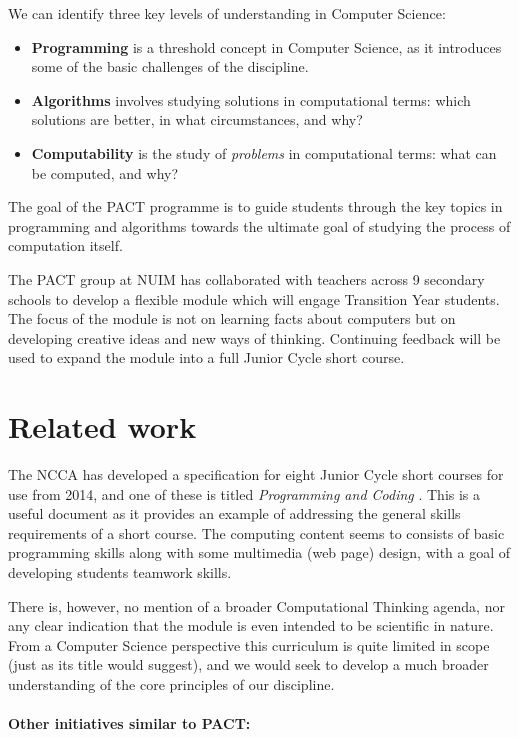 \documentclass[a4paper]{article}
\begin{document}
We can identify three key levels of understanding in Computer Science:
\begin{itemize}
\item \textbf{Programming} is a threshold concept in Computer Science, as it introduces some of the basic challenges of the discipline.  
\item \textbf{Algorithms} involves studying solutions in computational terms: which solutions are better, in what circumstances, and why?
\item \textbf{Computability} is the study of \textit{problems} in 
computational terms: what can be computed, and why?
\end{itemize}

The goal of the PACT programme is to guide students through the key topics in programming and algorithms towards the ultimate goal of studying the process of computation itself.

The PACT group at NUIM has collaborated with teachers across 9 secondary schools to develop a flexible module which will engage Transition Year students.  The focus of the module is not on learning facts about computers but on developing creative ideas and new ways of thinking.  Continuing feedback will be used to expand the module into a full Junior Cycle short course. 

\section{Related work} \label{sect:relWork}

The NCCA has developed a specification for eight Junior Cycle short courses for use from 2014, and one of these is 
titled \textit{Programming and Coding} \cite{ncca-prog13}.  This is a useful document as it provides an example of addressing the general skills requirements of a short course.  The computing content seems to consists of basic programming skills along with some multimedia (web page) design, with a goal of developing students teamwork skills.  

There is, however, no mention of a broader Computational Thinking agenda, nor any clear indication that the module is even intended to be scientific in nature.  From a Computer Science perspective this curriculum is quite limited in scope (just as its title would suggest), and we would seek to develop a much broader understanding of the core principles of our discipline.

\paragraph{Other initiatives similar to PACT:}
\end{document}
